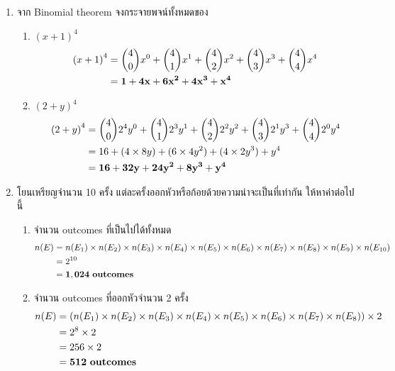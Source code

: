\documentclass{article}
\begin{document}
\begin{enumerate}
	\item จาก Binomial theorem จงกระจายพจน์ทั้งหมดของ
	\begin{enumerate}
		\item ${(x + 1)}^4$
		\begin{equation}
		\begin{split}
		{(x + 1)}^4 &= \binom{4}{0} x^0 +  \binom{4}{1} x^1 + \binom{4}{2} x^2 + \binom{4}{3} x^3 + \binom{4}{4} x^4 \notag \\
		&=  \mathbf{1 + 4x + 6x^2 + 4x^3 + x^4}
		\end{split}
		\end{equation}
		
		\item ${(2 + y)}^4$
		\begin{equation}
		\begin{split}
		{(2 + y)}^4 &= \binom{4}{0} 2^4y^0 + \binom{4}{1} 2^3y^1 + \binom{4}{2} 2^2y^2 + \binom{4}{3} 2^1y^3 + \binom{4}{4} 2^0y^4 \notag \\
		&= 16 + (4 \times 8y) + (6 \times 4y^2) + (4 \times 2y^3) + y^4 \\
		&=  \mathbf{16 + 32y + 24y^2 + 8y^3 + y^4}
		\end{split}
		\end{equation}
	\end{enumerate}
	
\pagebreak
	
	\item โยนเหรียญจำนวน 10 ครั้ง แต่ละครั้งออกหัวหรือก้อยด้วยความน่าจะเป็นที่เท่ากัน ให้หาค่าต่อไปนี้
	\begin{enumerate}
		\item จำนวน outcomes ที่เป็นไปได้ทั้งหมด
		\begin{equation}
		\begin{split}
		n(E) &= n(E_1) \times n(E_2) \times n(E_3) \times n(E_4) \times n(E_5) \times n(E_6) \times n(E_7) \times n(E_8) \times n(E_9) \times n(E_{10}) \notag \\
		&= 2^{10} \\
		&=  \mathbf{1,024~outcomes}
		\end{split}
		\end{equation}
		
		\item จำนวน outcomes ที่ออกหัวจำนวน 2 ครั้ง
		\begin{equation}
		\begin{split}
		n(E) &= (n(E_1) \times n(E_2) \times n(E_3) \times n(E_4) \times n(E_5) \times n(E_6) \times n(E_7) \times n(E_8)) \times 2 \notag \\
		&= 2^8 \times 2 \\
		&= 256 \times 2 \\
		&=  \mathbf{512~outcomes}
		\end{split}
		\end{equation}
		

\end{enumerate}
\end{enumerate}
\end{document}

